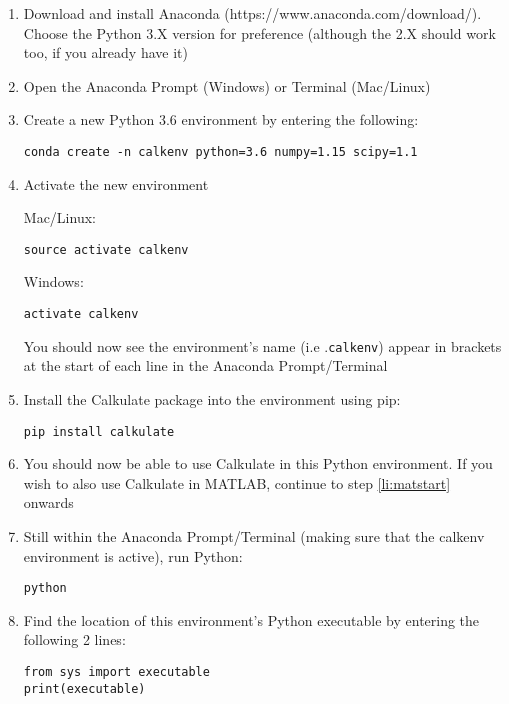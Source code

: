 \documentclass[10pt,a4paper,twoside]{article}
\begin{document}
\begin{enumerate}

  \item\label{li:pystart} Download and install Anaconda (https://www.anaconda.com/download/). Choose the Python 3.X version for preference (although the 2.X should work too, if you already have it)
  
  \item Open the Anaconda Prompt (Windows) or Terminal (Mac/Linux)
  
  \item Create a new Python 3.6 environment by entering the following:
\begin{verbatim}conda create -n calkenv python=3.6 numpy=1.15 scipy=1.1\end{verbatim}

  \item Activate the new environment
  
Mac/Linux:
\begin{verbatim}source activate calkenv\end{verbatim}

Windows:
\begin{verbatim}activate calkenv\end{verbatim}

  You should now see the environment's name (i.e .\texttt{calkenv}) appear in brackets at the start of each line in the Anaconda Prompt/Terminal

  \item Install the Calkulate package into the environment using pip:
\begin{verbatim}pip install calkulate\end{verbatim}

  \item\label{li:pyend} You should now be able to use Calkulate in this Python environment. If you wish to also use Calkulate in MATLAB, continue to step \ref{li:matstart} onwards
  
  \item\label{li:matstart} Still within the Anaconda Prompt/Terminal (making sure that the calkenv environment is active), run Python:
\begin{verbatim}python\end{verbatim}

  \item Find the location of this environment's Python executable by entering the following 2 lines:
\begin{verbatim}
from sys import executable
print(executable)
\end{verbatim}


\end{enumerate}
\end{document}
